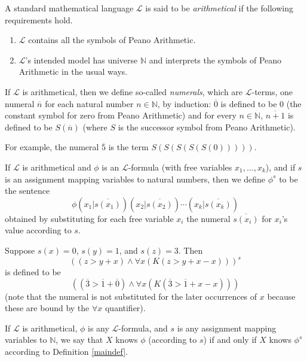 \documentclass[runningheads]{llncs}
\begin{document}
\begin{definition}
  A standard mathematical language $\mathscr L$ is said to be \emph{arithmetical}
  if the following requirements hold.
  \begin{enumerate}
    \item $\mathscr L$ contains all the symbols of Peano Arithmetic.
    \item $\mathscr L$'s intended model has universe $\mathbb N$ and interprets
    the symbols of Peano Arithmetic in the usual ways.
  \end{enumerate}
\end{definition}

\begin{definition}
  If $\mathscr L$ is arithmetical, then we define so-called \emph{numerals}, which
  are $\mathscr L$-terms, one numeral $\overline n$ for each natural number $n\in\mathbb N$,
  by induction: $\overline 0$ is defined to be $0$ (the constant symbol for zero from
  Peano Arithmetic) and
  for every $n\in\mathbb N$, $\overline{n+1}$ is defined to be $S(\overline n)$
  (where $S$ is the successor symbol from Peano Arithmetic).
\end{definition}

For example, the numeral $\overline 5$ is the term $S(S(S(S(S(0)))))$.

\begin{definition}
  If $\mathscr L$ is arithmetical and $\phi$ is an $\mathscr L$-formula (with free variables
  $x_1,\ldots,x_k$),
  and if $s$ is an assignment mapping variables to natural numbers, then we define $\phi^s$
  to be the sentence
  \[
    \phi(x_1|\overline{s(x_1)})(x_2|\overline{s(x_2)})\cdots (x_k|\overline{s(x_k)})
  \]
  obtained by substituting for each free variable $x_i$ the numeral $\overline{s(x_i)}$
  for $x_i$'s value according to $s$.
\end{definition}

\begin{example}
  Suppose $s(x)=0$, $s(y)=1$, and $s(z)=3$. Then
  \[
  ((z>y+x) \wedge \forall x(K(z>y+x-x)))^s
  \]
  is defined to be
  \[
  ((\overline 3 > \overline 1+\overline 0)
  \wedge \forall x( K( \overline 3 > \overline 1 + x - x ) ))
  \]
  (note that the numeral is not substituted for the later occurrences of $x$ because
  these are bound by the $\forall x$ quantifier).
\end{example}

\begin{definition}
\label{maindefextension}
  If $\mathscr L$ is arithmetical, $\phi$ is any $\mathscr L$-formula,
  and $s$ is any assignment mapping variables to $\mathbb N$,
  we say that $X$ knows $\phi$ (according to $s$) if and only if
  $X$ knows $\phi^s$ according to Definition \ref{maindef}.
\end{definition}
\end{document}
